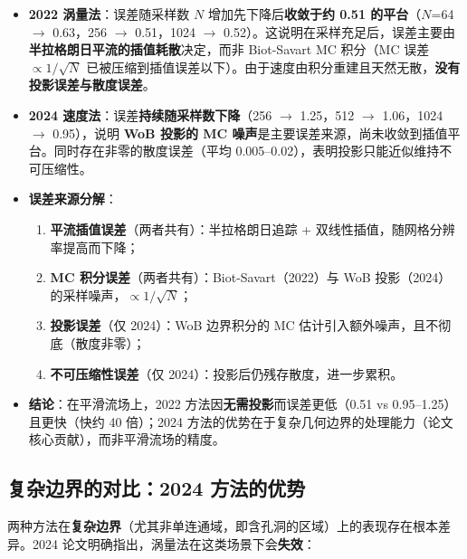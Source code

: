 \documentclass[12pt,a4paper]{article}
\begin{document}
\begin{itemize}
    \item \textbf{2022 涡量法}：误差随采样数 $N$ 增加先下降后\textbf{收敛于约 0.51 的平台}（$N$=64 $\to$ 0.63，256 $\to$ 0.51，1024 $\to$ 0.52）。这说明在采样充足后，误差主要由\textbf{半拉格朗日平流的插值耗散}决定，而非 Biot-Savart MC 积分（MC 误差 $\propto 1/\sqrt{N}$ 已被压缩到插值误差以下）。由于速度由积分重建且天然无散，\textbf{没有投影误差与散度误差}。

    \item \textbf{2024 速度法}：误差\textbf{持续随采样数下降}（256 $\to$ 1.25，512 $\to$ 1.06，1024 $\to$ 0.95），说明 \textbf{WoB 投影的 MC 噪声}是主要误差来源，尚未收敛到插值平台。同时存在非零的散度误差（平均 0.005--0.02），表明投影只能近似维持不可压缩性。

    \item \textbf{误差来源分解}：
    \begin{enumerate}[label=(\arabic*)]
        \item \textbf{平流插值误差}（两者共有）：半拉格朗日追踪 + 双线性插值，随网格分辨率提高而下降；
        \item \textbf{MC 积分误差}（两者共有）：Biot-Savart（2022）与 WoB 投影（2024）的采样噪声，$\propto 1/\sqrt{N}$；
        \item \textbf{投影误差}（仅 2024）：WoB 边界积分的 MC 估计引入额外噪声，且不彻底（散度非零）；
        \item \textbf{不可压缩性误差}（仅 2024）：投影后仍残存散度，进一步累积。
    \end{enumerate}

    \item \textbf{结论}：在平滑流场上，2022 方法因\textbf{无需投影}而误差更低（0.51 vs 0.95--1.25）且更快（快约 40 倍）；2024 方法的优势在于复杂几何边界的处理能力（论文核心贡献），而非平滑流场的精度。
\end{itemize}

\subsection{复杂边界的对比：2024 方法的优势}

两种方法在\textbf{复杂边界}（尤其非单连通域，即含孔洞的区域）上的表现存在根本差异。2024 论文明确指出，涡量法在这类场景下会\textbf{失效}：
\end{document}
